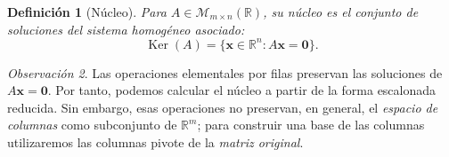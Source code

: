 \documentclass[12pt]{article}
\newtheorem{definicion}{Definición}[section]
\theoremstyle{remark}
\newtheorem{observacion}[definicion]{Observación}
\newcommand{\R}{\mathbb{R}}
\newcommand{\Mat}[2]{\mathcal{M}_{#1\times #2}}
\newcommand{\Ker}{\operatorname{Ker}}
\newcommand{\vect}[1]{\boldsymbol{#1}}
\begin{document}
\begin{definicion}[Núcleo]
Para $A\in\Mat{m}{n}(\R)$, su \emph{núcleo} es el conjunto de soluciones del sistema homogéneo asociado:
\[
\boxed{\Ker(A)=\{\vect{x}\in\R^n:A\vect{x}=\vect{0}\}.}
\]
\end{definicion}

\begin{observacion}
Las operaciones elementales por filas preservan las soluciones de $A\vect{x}=\vect0$. Por tanto, podemos calcular el núcleo a partir de la forma escalonada reducida. Sin embargo, esas operaciones no preservan, en general, el \emph{espacio de columnas} como subconjunto de $\R^m$; para construir una base de las columnas utilizaremos las columnas pivote de la \emph{matriz original}.
\end{observacion}
\end{document}
